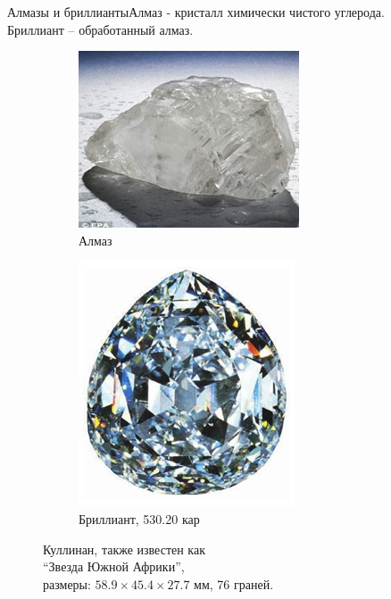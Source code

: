 \documentclass[_Banking_p3.tex]{subfiles}
\begin{document}
\begin{frame}{Алмазы и бриллианты}{Алмаз - кристалл химически чистого углерода.\\  Бриллиант – обработанный алмаз.}
\begin{figure}	
	\centering
	\begin{subfigure}[t]{4.3cm}
		\centering
		\includegraphics[scale=0.85]{img/cullinan_raw.png}
		\caption{Алмаз}\label{fig:a_cullinan_raw}
	\end{subfigure}
	\quad
	\begin{subfigure}[t]{4.3cm}
		\centering
		\includegraphics[scale=0.6]{img/uar_star.png}
	\caption{Бриллиант, 530.20 кар}\label{fig:b_cullinan}	
	\end{subfigure}
	\caption{Куллинан, также известен как\\ ``Звезда Южной Африки'', \\ размеры: $58.9 \times  45.4 \times  27.7$ мм, 76 граней.}\label{fig:diamonds1}
\end{figure}
\end{frame}
\end{document}
